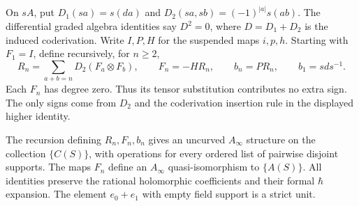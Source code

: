 On $sA$, put $D_1(sa)=s(da)$ and
$D_2(sa,sb)=(-1)^{|a|}s(ab)$.  The differential graded algebra
identities say $D^2=0$, where $D=D_1+D_2$ is the induced coderivation.
Write $I,P,H$ for the suspended maps $i,p,h$.  Starting with
$F_1=I$, define recursively, for $n\ge2$,
\begin{equation*}
 R_n=\sum_{a+b=n}D_2(F_a\otimes F_b),\qquad
 F_n=-H R_n,\qquad b_n=P R_n,
 \qquad b_1=s d s^{-1}.
\end{equation*}
Each $F_n$ has degree zero.  Thus its tensor substitution contributes
no extra sign.  The only signs come from $D_2$ and the coderivation
insertion rule in the displayed higher identity.

\begin{theorem}
\label{thm:interval-free-field-transfer}
The recursion defining $R_n,F_n,b_n$ gives an
uncurved $A_\infty$ structure on the collection $\{C(S)\}$, with operations for every
ordered list of pairwise disjoint supports.  The maps $F_n$ define
an $A_\infty$ quasi-isomorphism to $\{A(S)\}$.  All identities preserve
the rational holomorphic coefficients and their formal $\hbar$ expansion.
The element $e_0+e_1$ with empty field support is a strict unit.
\end{theorem}
